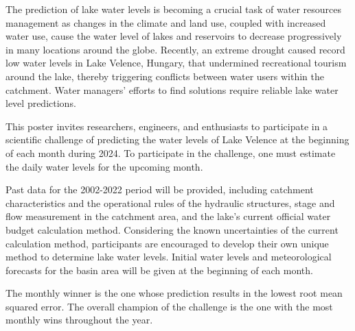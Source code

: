 \noindent

The prediction of lake water levels is becoming a crucial task of water resources management as changes in the climate and land use, coupled with increased water use, cause the water level of lakes and reservoirs to decrease progressively in many locations around the globe. Recently, an extreme drought caused record low water levels in Lake Velence, Hungary, that undermined recreational tourism around the lake, thereby triggering conflicts between water users within the catchment. Water managers' efforts to find solutions require reliable lake water level predictions.

This poster invites researchers, engineers, and enthusiasts to participate in a scientific challenge of predicting the water levels of Lake Velence at the beginning of each month during 2024. To participate in the challenge, one must estimate the daily water levels for the upcoming month. 

Past data for the 2002-2022 period will be provided, including catchment characteristics and the operational rules of the hydraulic structures, stage and flow measurement in the catchment area, and the lake's current official water budget calculation method. Considering the known uncertainties of the current calculation method, participants are encouraged to develop their own unique method to determine lake water levels. Initial water levels and meteorological forecasts for the basin area will be given at the beginning of each month. 

The monthly winner is the one whose prediction results in the lowest root mean squared error. The overall champion of the challenge is the one with the most monthly wins throughout the year.



